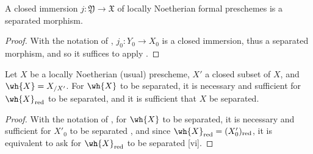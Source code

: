 \begin{prop}[10.15.6]
\label{1.10.15.6}
A closed immersion $j:\mathfrak{Y}\to\mathfrak{X}$ of locally Noetherian formal preschemes is a separated morphism.
\end{prop}

\begin{proof}
\label{proof-1.10.15.6}
With the notation of , $j_0:Y_0\to X_0$ is a closed immersion, thus a separated morphism, and so it suffices to apply .
\end{proof}

\begin{prop}[10.15.7]
\label{1.10.15.7}
Let $X$ be a locally Noetherian (usual) prescheme, $X'$ a closed subset of $X$, and $\wh{X}=X_{/X'}$.
For $\wh{X}$ to be separated, it is necessary and sufficient for $\wh{X}_\red$ to be separated, and it is sufficient that $X$ be separated.
\end{prop}

\begin{proof}
\label{proof-1.10.15.7}
With the notation of , for $\wh{X}$ to be separated, it is necessary and sufficient for $X'_0$ to be separated , and since $\wh{X}_\red=(X'_0)_\red$, it is equivalent to ask for $\wh{X}_\red$ to be separated [vi].
\end{proof}
